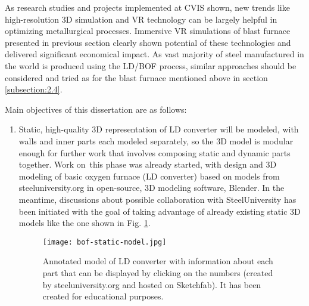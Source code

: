 As research studies and projects implemented at CVIS shown, new trends like high-resolution 3D simulation and VR technology can be largely helpful in optimizing metallurgical processes. Immersive VR simulations of blast furnace presented in previous section clearly shown potential of these technologies and delivered significant economical impact. As vast majority of steel manufactured in the world is produced using the LD/BOF process, similar approaches should be considered and tried as for the blast furnace mentioned above in section \ref{subsection:2.4}. 

Main objectives of this dissertation are as follows:

\begin{enumerate}
\item{Static, high-quality 3D representation of LD converter will be modeled, with walls and inner parts each modeled separately, so the 3D model is modular enough for further work that involves composing static and dynamic parts together. Work on~this phase was already started, with design and 3D modeling of basic oxygen furnace (LD converter) based on models from steeluniversity.org in open-source, 3D modeling software, Blender. In the meantime, discussions about possible collaboration with SteelUniversity has been initiated with the goal of taking advantage of already existing static 3D models like the one shown in Fig. \ref{o:3.1}.

\begin{figure}[ht!]
	\centering
	\texttt{[image: bof-static-model.jpg]}
	\caption{Annotated model of LD converter with information about each part that can be displayed by clicking on the numbers (created by steeluniversity.org and hosted on Sketchfab). It has been created for educational purposes.}
	\label{o:3.1}
\end{figure}

}
\end{enumerate}
